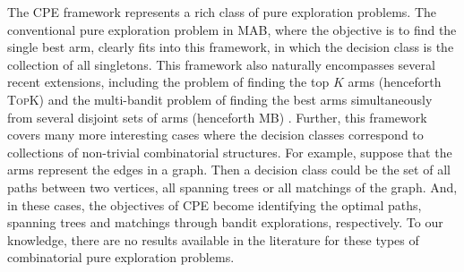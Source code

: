 \documentclass{article}
\newcommand{\Problem}{{CPE}\xspace}
\newcommand{\MultiIdent}{\textsc{TopK}\xspace}
\newcommand{\MultiBandit}{\textsc{MB}\xspace}
\begin{document}
The \Problem framework represents a rich class of pure exploration problems.
The conventional pure exploration problem in MAB, where the objective is to find the single best arm, clearly fits into this framework, in which the decision class is the collection of all singletons. 
This framework also naturally encompasses several recent extensions, including the problem of finding the top $K$ arms (henceforth \MultiIdent) \citep{kalyanakrishnan2010efficient,kalyanakrishnan2012pac,bubeck2013multiple,zhou2014optimal} and the
multi-bandit problem of finding the best arms simultaneously from several disjoint sets of arms (henceforth \MultiBandit) \citep{NIPS2011_4478,bubeck2013multiple}.
Further, this framework  covers many more interesting cases where the decision classes correspond to collections of non-trivial combinatorial structures.
For example, suppose that the arms represent the edges in a graph.
Then a decision class could be the set of all paths between two vertices, all spanning trees or all matchings of the graph. 
And, in these cases, the objectives of \Problem become identifying the optimal paths, spanning trees and matchings through bandit explorations, respectively.
To our knowledge, there are no results available in the literature for these types of combinatorial pure exploration problems.

\end{document}

